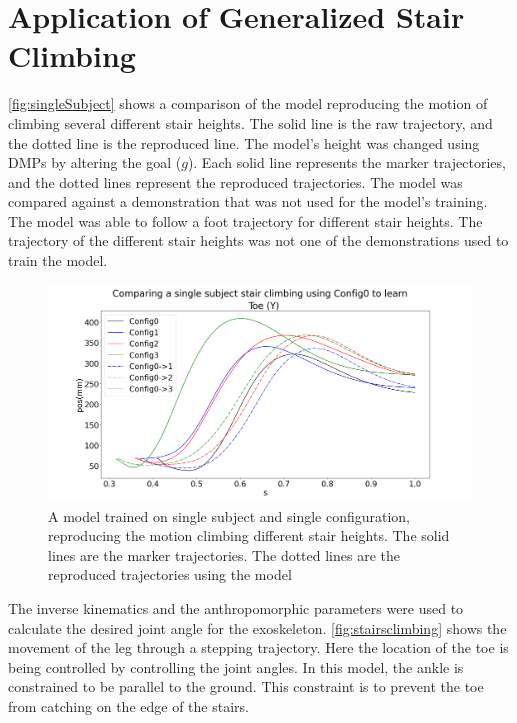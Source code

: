 \section{Application of Generalized Stair Climbing}


\autoref{fig:singleSubject} shows a comparison of the model reproducing the motion of climbing several different stair heights. The solid line is the raw trajectory, and the dotted line is the reproduced line. The model's height was changed using DMPs by altering the goal ($g$). Each solid line represents the marker trajectories, and the dotted lines represent the reproduced trajectories. The model was compared against a demonstration that was not used for the model's training. The model was able to follow a foot trajectory for different stair heights. The trajectory of the different stair heights was not one of the demonstrations used to train the model.

\begin{figure}[h]
    \centering
    \includegraphics[scale=0.3]{images/stairs/compareHeihgts.png}
    \caption[Reproducing the Motion Climbing Different]{A model trained on single subject and single configuration, reproducing the motion climbing different stair heights. The solid lines are the marker trajectories. The dotted lines are the reproduced trajectories using the model}
    \label{fig:singleSubject}
\end{figure}

The inverse kinematics and the anthropomorphic parameters were used to calculate the desired joint angle for the exoskeleton. \autoref{fig:stairsclimbing} shows the movement of the leg through a stepping trajectory. Here the location of the toe is being controlled by controlling the joint angles. In this model, the ankle is constrained to be parallel to the ground. This constraint is to prevent the toe from catching on the edge of the stairs.


